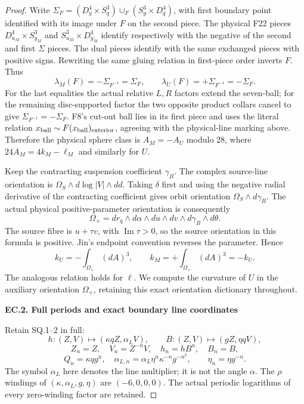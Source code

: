 \begin{proof}
Write
\(\Sigma_F=(D^4_y\times S^3_q)\cup_F(S^3_y\times D^4_q)\),
with first boundary point identified with its image under \(F\)
on the second piece. The physical F22 pieces
\(D^4_{u_M}\times S^3_{y_M}\) and
\(S^3_{u_M}\times D^4_{y_M}\) identify respectively with the
negative of the second and first \(\Sigma\) pieces. The dual
pieces identify with the same exchanged pieces with positive
signs. Rewriting the same gluing relation in first-piece order
inverts \(F\). Thus
\[
 \lambda_M(F)=-\Sigma_{F^{-1}}=\Sigma_F,\qquad
 \lambda_U(F)=+\Sigma_{F^{-1}}=-\Sigma_F.                 \tag{EC.3}
\]
For the last equalities the actual relative \(L,R\) factors extend
the seven-ball; for the remaining disc-supported factor the two
opposite product collars cancel to give
\(\Sigma_{F^{-1}}=-\Sigma_F\). F8's cut-out ball lies in its
first piece and uses the literal relation
\(x_{\rm ball}\sim F(x_{\rm ball})_{\rm exterior}\), agreeing
with the physical-line marking above. Therefore the physical
sphere class is \(A_M=-A_U\) modulo 28, where
\(24A_M=4k_M-\ell_M\) and similarly for \(U\).

Keep the contracting suspension coefficient \(\gamma_B\).
The complex source-line orientation is
\(\Omega_S\wedge d\log|V|\wedge dd\). Taking \(\delta\) first
and using the negative radial derivative of the contracting
coefficient gives orbit orientation \(\Omega_S\wedge d\gamma_B\).
The actual physical positive-parameter orientation is consequently
\[
 \Omega_+=dr_q\wedge d\alpha\wedge du\wedge dv
                   \wedge d\gamma_B\wedge d\theta.       \tag{EC.4}
\]
The source fibre is \(u+\tau v\), with \(\operatorname{Im}\tau>0\),
so the source orientation in this formula is positive. Jin's endpoint
convention reverses the parameter. Hence
\[
 k_U=-\int_{\Omega_+}(dA)^3,\qquad
 k_M=+\int_{\Omega_+}(dA)^3=-k_U.
\]
The analogous relation holds for \(\ell\). We compute the curvature
of \(U\) in the auxiliary orientation \(\Omega_+\), retaining
this exact orientation dictionary throughout.

\par

\medskip\noindent\textbf{EC.2. Full periods and exact boundary line coordinates}

\par\nobreak

Retain SQ.1--2 in full:
\[
 h:(Z,V)\mapsto(\kappa qZ,\alpha_L V),\qquad
 B:(Z,V)\mapsto(gZ,\eta qV),
\]
\[
 Z_n=Z,\quad V_n=Z^{-n}V,\quad h_n=hB^n,\quad B_n=B,
\]
\[
 Q_n=\kappa qg^n,\quad
 \alpha_{L,n}=\alpha_L\eta^n\kappa^{-n}g^{-n^2},
 \qquad\eta_n=\eta g^{-n}.
                                                        \tag{EC.5}
\]
The symbol \(\alpha_L\) here denotes the line multiplier; it is
not the angle \(\alpha\). The \(\rho\) windings of
\((\kappa,\alpha_L,g,\eta)\) are \((-6,0,0,0)\).
The actual periodic logarithms of every zero-winding factor are
retained.


\end{proof}
